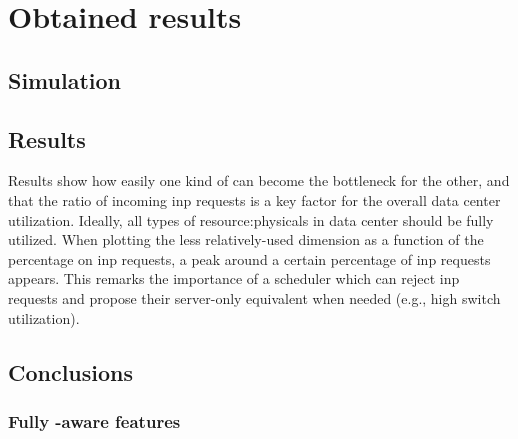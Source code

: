 \section{Obtained results}

\subsection{Simulation}




\subsection{Results}
Results show how easily one kind of  can become the bottleneck for the other, and that the ratio of incoming \gls{inp} requests is a key factor for the overall data center utilization.
Ideally, all types of \glspl{resource:physical} in data center should be fully utilized.
When plotting the less relatively-used  dimension as a function of the percentage on \gls{inp} requests, a peak around a certain percentage of \gls{inp} requests appears.
This remarks the importance of a scheduler which can reject \gls{inp} requests and propose their server-only equivalent when needed (e.g., high switch utilization).

\subsection{Conclusions}


\subsubsection{Fully \texorpdfstring{}{INP}-aware \texorpdfstring{}{RM} features}


% 


{\footnotesize}


